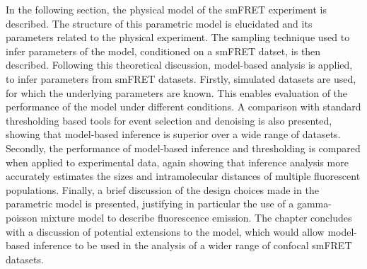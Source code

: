 In the following section, the physical model of the smFRET experiment is described. The structure of this parametric model is elucidated and its parameters related to the physical experiment. The sampling technique used to infer parameters of the model, conditioned on a smFRET datset, is then described. Following this theoretical discussion, model-based analysis is applied, to infer parameters from smFRET datasets. Firstly, simulated datasets are used, for which the underlying parameters are known. This enables evaluation of the performance of the model under different conditions. A comparison with standard thresholding based tools for event selection and denoising is also presented, showing that model-based inference is superior over a wide range of datasets. Secondly, the performance of model-based inference and thresholding is compared when applied to experimental data, again showing that inference analysis more accurately estimates the sizes and intramolecular distances of multiple fluorescent populations. Finally, a brief discussion of the  design choices made in the parametric model is presented, justifying in particular the use of a gamma-poisson mixture model to describe fluorescence emission. The chapter concludes with a discussion of potential extensions to the model, which would allow model-based inference to be used in the analysis of a wider range of confocal smFRET datasets.   




